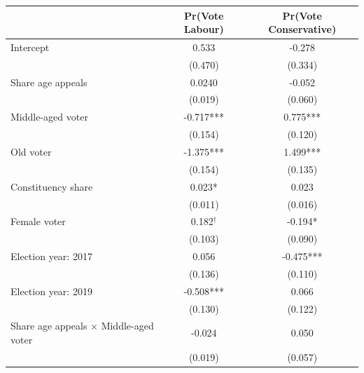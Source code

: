 \begin{table}[H]
\centering
\begin{tabular}{lcc}
\toprule
 & Pr(Vote Labour) & Pr(Vote Conservative) \\
\midrule
Intercept & 0.533 & -0.278 \\
          & (0.470) & (0.334) \\

Share age appeals & 0.0240 & -0.052 \\
                  & (0.019) & (0.060) \\

Middle-aged voter & -0.717*** & 0.775*** \\
                  & (0.154) & (0.120) \\

Old voter & -1.375*** & 1.499*** \\
          & (0.154) & (0.135) \\

Constituency share & 0.023* & 0.023 \\
                   & (0.011) & (0.016) \\

Female voter & 0.182$^{\dagger}$ & -0.194* \\
             & (0.103) & (0.090) \\

Election year: 2017 & 0.056 & -0.475*** \\
                    & (0.136)   & (0.110) \\

Election year: 2019 & -0.508*** & 0.066 \\
                   & (0.130) & (0.122) \\

Share age appeals $\times$ Middle-aged voter & -0.024 & 0.050 \\
                            & (0.019) & (0.057) \\


\end{tabular}
\end{table}
